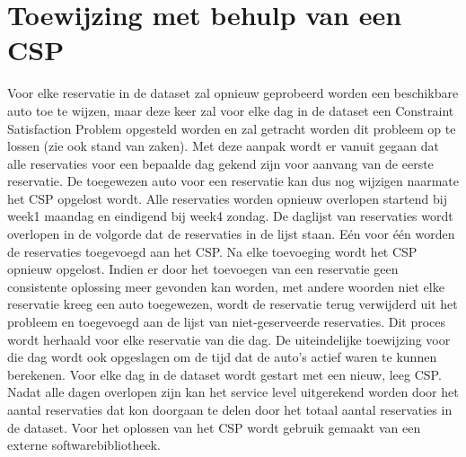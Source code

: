\section{Toewijzing met behulp van een CSP} \label{csp-toewijzing}
Voor elke reservatie in de dataset zal opnieuw geprobeerd worden een beschikbare auto toe te wijzen, maar deze keer zal voor elke dag in de dataset een Constraint Satisfaction Problem opgesteld worden en zal getracht worden dit probleem op te lossen (zie ook stand van zaken). Met deze aanpak wordt er vanuit gegaan dat alle reservaties voor een bepaalde dag gekend zijn voor aanvang van de eerste reservatie. De toegewezen auto voor een reservatie kan dus nog wijzigen naarmate het CSP opgelost wordt. Alle reservaties worden opnieuw overlopen startend bij week1 maandag en eindigend bij week4 zondag. De daglijst van reservaties wordt overlopen in de volgorde dat de reservaties in de lijst staan. Eén voor één worden de reservaties toegevoegd aan het CSP. Na elke toevoeging wordt het CSP opnieuw opgelost. Indien er door het toevoegen van een reservatie geen consistente oplossing meer gevonden kan worden, met andere woorden niet elke reservatie kreeg een auto toegewezen, wordt de reservatie terug verwijderd uit het probleem en toegevoegd aan de lijst van niet-geserveerde reservaties. Dit proces wordt herhaald voor elke reservatie van die dag. De uiteindelijke toewijzing voor die dag wordt ook opgeslagen om de tijd dat de auto's actief waren te kunnen berekenen. Voor elke dag in de dataset wordt gestart met een nieuw, leeg CSP. Nadat alle dagen overlopen zijn kan het service level uitgerekend worden door het aantal reservaties dat kon doorgaan te delen door het totaal aantal reservaties in de dataset. Voor het oplossen van het CSP wordt gebruik gemaakt van een externe softwarebibliotheek.





